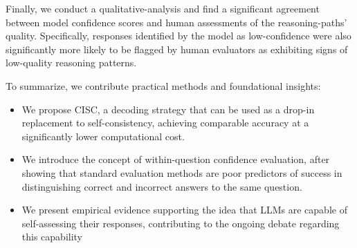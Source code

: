 Finally, we conduct a qualitative-analysis and find a significant agreement between model confidence scores and human assessments of the reasoning-paths' quality.  Specifically, responses identified by the model as low-confidence were also significantly more likely to be flagged by human evaluators as exhibiting signs of low-quality reasoning patterns.

To summarize, we contribute practical methods and foundational insights:
\begin{itemize}
    \item We propose CISC, a decoding strategy that can be used as a drop-in replacement to self-consistency, achieving comparable accuracy at a significantly lower computational cost.
    \item We introduce the concept of within-question confidence evaluation, after showing that standard evaluation methods are poor predictors of success in distinguishing correct and incorrect answers to the same question.
    \item We present empirical evidence supporting the idea that LLMs are capable of self-assessing their responses, contributing to the ongoing debate regarding this capability \cite{gero2023self, huang2023large, li2024confidence, stechly2024self}
\end{itemize}

